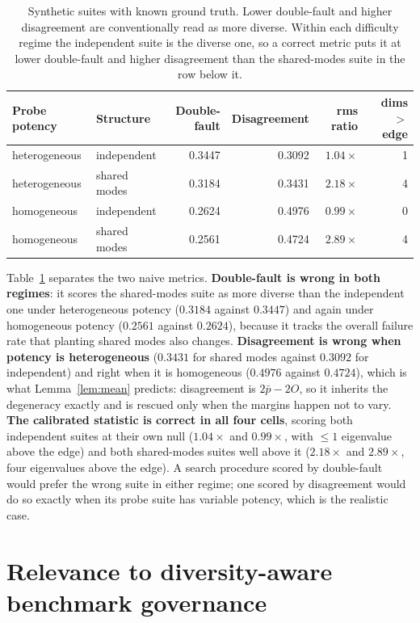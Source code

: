 \documentclass{article}
\begin{document}
\begin{table}[t]
\centering
\small
\begin{tabular}{llrrrr}
\toprule
Probe potency & Structure & Double-fault & Disagreement & rms ratio & dims $>$ edge \\
\midrule
heterogeneous & independent   & 0.3447 & 0.3092 & $1.04\times$ & 1 \\
heterogeneous & shared modes  & 0.3184 & 0.3431 & $2.18\times$ & 4 \\
homogeneous   & independent   & 0.2624 & 0.4976 & $0.99\times$ & 0 \\
homogeneous   & shared modes  & 0.2561 & 0.4724 & $2.89\times$ & 4 \\
\bottomrule
\end{tabular}
\caption{Synthetic suites with known ground truth. Lower double-fault and higher disagreement are
conventionally read as more diverse. Within each difficulty regime the independent suite is the
diverse one, so a correct metric puts it at lower double-fault and higher disagreement than the
shared-modes suite in the row below it.}
\label{tab:decision}
\end{table}

Table~\ref{tab:decision} separates the two naive metrics. \textbf{Double-fault is wrong in both
regimes}: it scores the shared-modes suite as more diverse than the independent one under
heterogeneous potency ($0.3184$ against $0.3447$) and again under homogeneous potency ($0.2561$
against $0.2624$), because it tracks the overall failure rate that planting shared modes also
changes. \textbf{Disagreement is wrong when potency is heterogeneous} ($0.3431$ for shared modes
against $0.3092$ for independent) and right when it is homogeneous ($0.4976$ against $0.4724$),
which is what Lemma~\ref{lem:mean} predicts: disagreement is $2\bar p - 2O$, so it inherits the
degeneracy exactly and is rescued only when the margins happen not to vary. \textbf{The calibrated
statistic is correct in all four cells}, scoring both independent suites at their own null
($1.04\times$ and $0.99\times$, with $\le 1$ eigenvalue above the edge) and both shared-modes suites
well above it ($2.18\times$ and $2.89\times$, four eigenvalues above the edge). A search procedure
scored by double-fault would prefer the wrong suite in either regime; one scored by disagreement
would do so exactly when its probe suite has variable potency, which is the realistic case.

\section{Relevance to diversity-aware benchmark governance}
\end{document}
